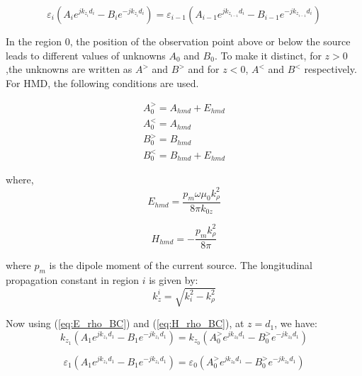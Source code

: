 \documentclass[11pt]{article}
\begin{document}
  \begin{equation}
    \varepsilon_i \left( A_i e^{jk_{z_i} d_i} - B_i e^{-jk_{z_i} d_i}  \right) = \varepsilon_{i-1} \left( A_{i-1} e^{jk_{z_{i-1}} d_i} - B_{i-1} e^{-jk_{z_{i-1}} d_i}  \right)
    \label{eq:H_rho_BC}
  \end{equation}

  In the region 0, the position of the observation point above or below the source leads to different values of unknowns $A_0$ and $B_0$. To make it distinct, for $z>0$,the unknowns are written as $A^>$ and $B^>$ and for $z<0$, $A^<$ and $B^<$ respectively. For HMD, the following conditions are used.\cite{kong1990electromagnetic}

  \begin{subequations}
    \begin{align}
      A_0^> = A_{hmd} + E_{hmd} \\
      A_0^< = A_{hmd}
      \label{eq:A_0} \\
      B_0^> = B_{hmd} \\
      B_0^< = B_{hmd} + E_{hmd}
      \label{eq:B_0}
    \end{align}
    \label{eq:hmd}
  \end{subequations}

  where,
  \begin{equation}
    E_{hmd} = \frac{p_m \omega \mu_0 k_{\rho}^2}{8 \pi k_{0z}}
    \label{eq:E_hmd}
  \end{equation}

  \begin{equation}
    H_{hmd} = -\frac{p_m k_{\rho}^2}{8 \pi}
    \label{eq:H_hmd}
  \end{equation}

  where $p_m$ is the dipole moment of the current source. The longitudinal propagation constant in region $i$ is given by:
  \begin{equation}
    k_z^i = \sqrt{k_i^2 - k_{\rho}^2}
    \label{eq:k}
  \end{equation}

  Now using (\ref{eq:E_rho_BC}) and (\ref{eq:H_rho_BC}), at $z=d_1$, we have:
  \begin{equation}
    k_{z_1} \left( A_1 e^{jk_{z_1} d_1} - B_1 e^{-jk_{z_1} d_1}  \right) = k_{z_0} \left( A_{0}^> e^{jk_{z_0} d_1} - B_{0}^> e^{-jk_{z_0} d_1}  \right)
    \label{eq:E_rho_d1}
  \end{equation}

  \begin{equation}
    \varepsilon_1 \left( A_1 e^{jk_{z_1} d_1} - B_1 e^{-jk_{z_1} d_1}  \right) = \varepsilon_{0} \left( A_{0}^> e^{jk_{z_0} d_1} - B_{0}^> e^{-jk_{z_0} d_1}  \right)
    \label{eq:H_rho_d1}
  \end{equation}
\end{document}
